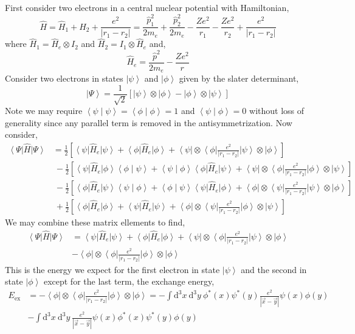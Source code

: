 \documentclass[12pt]{extarticle}
\newcommand{\dn}[2]{ \mathrm{d}^{#1} #2 \:}
\theoremstyle{definition}
\renewcommand{\H}{\hat{H}}
\newcommand{\inner}[2]{\left< #1 \middle| #2 \right>}
\newcommand{\ket}[1]{\left| #1 \right>}
\newcommand{\bra}[1]{\left< #1 \right|}
\begin{document}
First consider two electrons in a central nuclear potential with Hamiltonian,
\[ \H = \H_1 + \H_2 + \frac{e^2}{|r_1 - r_2|} = \frac{\hat{p}_1^2}{2 m_e} + \frac{\hat{p}_2^2}{2 m_e} - \frac{Z e^2}{r_1} - \frac{Z e^2}{r_2} + \frac{e^2}{|r_1 - r_2|} \]
where $\H_1 = \H_{e} \otimes I_2$ and $\H_2 = I_1 \otimes \H_e$ and,
\[ \H_e = \frac{\hat{p}^2}{2 m_e} - \frac{Z e^2}{r} \]
Consider two electrons in states $\ket{\psi}$ and $\ket{\phi}$ given by the slater determinant,
\[ \ket{\Psi} = \frac{1}{\sqrt{2}} \left[ \ket{\psi} \otimes \ket{\phi} - \ket{\phi} \otimes \ket{\psi} \right] \] 
Note we may require $\inner{\psi}{\psi} = \inner{\phi}{\phi} =1$ and $\inner{\psi}{\phi} = 0$ without loss of generality since any parallel term is removed in the antisymmetrization. Now consider,
\begin{align*}
\bra{\Psi} \H \ket{\Psi} & = \frac{1}{2} \left[ \bra{\psi} \H_e \ket{\psi} + \bra{\phi} \H_e \ket{\phi} + \bra{\psi} \otimes \bra{\phi} \frac{e^2}{|r_1 - r_2|} \ket{\psi} \otimes \ket{\phi} \right]
\\
& \: - \frac{1}{2} \left[ \bra{\psi} \H_e \ket{\phi} \inner{\phi}{\psi} + \inner{\psi}{\phi} \bra{\phi} \H_e \ket{\psi}  + \bra{\psi} \otimes \bra{\phi} \frac{e^2}{|r_1 - r_2|} \ket{\phi} \otimes \ket{\psi} \right]
\\
& \: - \frac{1}{2} \left[ \bra{\phi} \H_e \ket{\psi} \inner{\psi}{\phi} + \inner{\phi}{\psi} \bra{\psi} \H_e \ket{\phi} + \bra{\phi} \otimes \bra{\psi} \frac{e^2}{|r_1 - r_2|} \ket{\psi} \otimes \ket{\phi} \right]
\\
& \: + \frac{1}{2} \left[ \bra{\phi} \H_e \ket{\phi} + \bra{\psi} \H_e \ket{\psi} + \bra{\phi} \otimes \bra{\psi} \frac{e^2}{|r_1 - r_2|} \ket{\phi} \otimes \ket{\psi} \right]
\end{align*}
We may combine these matrix ellements to find,
\begin{align*}
\bra{\Psi} \H \ket{\Psi} & = \bra{\psi} \H_e \ket{\psi} + \bra{\phi} \H_e \ket{\phi}
 + \bra{\psi} \otimes \bra{\phi} \frac{e^2}{|r_1 - r_2|} \ket{\psi} \otimes \ket{\phi} 
\\
& - \bra{\phi} \otimes \bra{\phi} \frac{e^2}{|r_1 - r_2|} \ket{\phi} \otimes \ket{\phi}
\end{align*}
This is the energy we expect for the first electron in state $\ket{\psi}$ and the second in state $\ket{\phi}$ except for the last term, the exchange energy,
\begin{align*}
E_{\text{ex}} & = - \bra{\phi} \otimes \bra{\phi} \frac{e^2}{|r_1 - r_2|} \ket{\phi} \otimes \ket{\phi} = - \int \dn{3}{x} \dn{3}{y} \phi^*(x) \psi^*(y) \frac{e^2}{|\vec{x} - \vec{y}|} \psi(x) \phi(y)
\\
& -  \int \dn{3}{x} \dn{3}{y} \frac{e^2}{|\vec{x} - \vec{y}|} \psi(x) \phi^*(x) \psi^*(y) \phi(y)
\end{align*}
\end{document}
